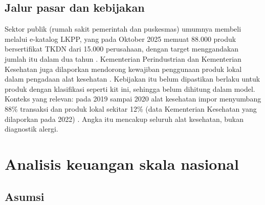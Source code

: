 \documentclass[11pt,a4paper]{article}
\begin{document}
\subsection{Jalur pasar dan kebijakan}

Sektor publik (rumah sakit pemerintah dan puskesmas) umumnya membeli melalui e-katalog LKPP, yang pada Oktober 2025 memuat 88.000 produk bersertifikat TKDN dari 15.000 perusahaan, dengan target menggandakan jumlah itu dalam dua tahun \cite{ekatalog}. Kementerian Perindustrian dan Kementerian Kesehatan juga dilaporkan mendorong kewajiban penggunaan produk lokal dalam pengadaan alat kesehatan \cite{p3dn}. Kebijakan itu belum dipastikan berlaku untuk produk dengan klasifikasi seperti kit ini, sehingga belum dihitung dalam model. Konteks yang relevan: pada 2019 sampai 2020 alat kesehatan impor menyumbang 88\% transaksi dan produk lokal sekitar 12\% (data Kementerian Kesehatan yang dilaporkan pada 2022) \cite{kemkes88}. Angka itu mencakup seluruh alat kesehatan, bukan diagnostik alergi.

\section{Analisis keuangan skala nasional}

\subsection{Asumsi}
\end{document}
